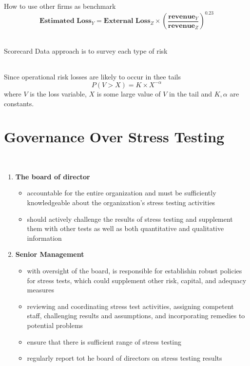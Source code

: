\documentclass[11pt,fleqn]{book} %
\numberwithin{equation}{section} %
\numberwithin{figure}{section} %
\numberwithin{table}{section} %
\begin{document}
\begin{theorem}

How to use other firms as benchmark 
$$
\textbf{Estimated Loss}_Y=\textbf{External Loss}_Z\times\left(\frac{\textbf{revenue}_Y}{\textbf{revenue}_Z}\right)^{0.23}
$$    
\end{theorem}
\begin{definition}\textbf{}\\
Scorecard Data approach is to survey each type of risk     
\end{definition}
\begin{theorem}\textbf{}\\
    Since operational risk losses are likely to occur in thee tails 
    $$
    P(V>X)=K\times X^{-\alpha}
    $$
    where $V$ is the loss variable, $X$ is some large value of $V$ in the tail and $K,\alpha$ are constants.
\end{theorem}
\chapter{Governance Over Stress Testing}
\begin{definition}\textbf{}\\
    \begin{enumerate}
        \item \textbf{The board of director} 
        \begin{itemize}
            \item accountable for the entire organization and must be sufficiently knowledgeable about the organization's stress testing activities
            \item should actively challenge the results of stress testing and supplement them with other tests as well as both quantitative and qualitative information
        \end{itemize}
        \item \textbf{Senior Management}
        \begin{itemize}
            \item with oversight of the board, is responsible for establishin robust policies for stress tests, which could supplement other risk, capital, and adequacy measures
            \item reviewing and coordinating stress test activities, assigning competent staff, challenging results and assumptions, and incorporating remedies to potential problems
            \item ensure that there is sufficient range of stress testing 
            \item regularly report tot he board of directors on stress testing results 
        \end{itemize}
    \end{enumerate}
\end{definition}
\end{document}
